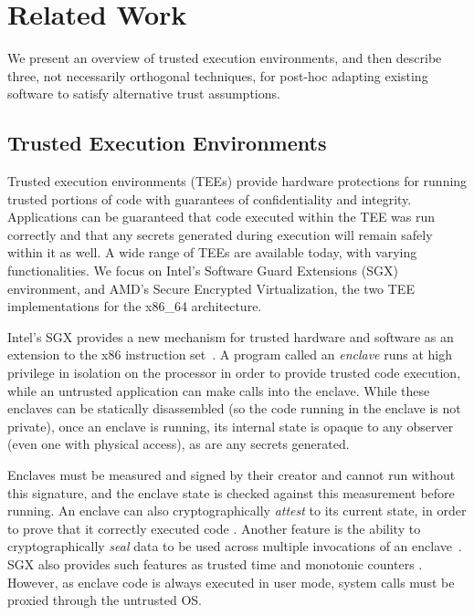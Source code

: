\section{Related Work}
\label{sec:related}

We present an overview of trusted execution environments, and then describe
three, not necessarily orthogonal techniques, for post-hoc adapting existing
software to satisfy alternative trust assumptions. 


\subsection{Trusted Execution Environments}

Trusted execution environments (TEEs) provide hardware protections for running
trusted portions of code with guarantees of confidentiality and integrity.  
%
Applications can be guaranteed that code executed within the TEE was run
correctly and that any secrets generated during execution will remain safely
within it as well.
%
A wide range of TEEs are available today, with varying functionalities.
%
We focus on Intel's Software Guard Extensions (SGX) environment, and AMD's
Secure Encrypted Virtualization, the two TEE implementations for the x86\_64
architecture.


%
Intel's SGX provides a new mechanism for trusted
hardware and software as an extension to the x86 instruction set~\cite{sgx,
mckeen2013innovative}.  
%
A program called an \textit{enclave} runs at high
privilege in isolation on the processor in order to provide trusted code
execution, while an untrusted application can make calls into the enclave.
%
While these enclaves can be statically disassembled (so the code running in the
enclave is not private), once an enclave is running, its internal state is
opaque to any observer (even one with physical access), as are any secrets generated.  


Enclaves must be measured and signed by their creator and cannot run without
this signature, and the enclave state is checked against this measurement
before running.  
%
An enclave can also cryptographically \textit{attest} to its current state, in
order to prove that it correctly executed code \cite{sgx_provisioning,
anati2013innovative}.  
%
Another feature is the ability to cryptographically \textit{seal} data to be
used across multiple invocations of an enclave~\cite{anati2013innovative,
sgx_sealing}.  
%
SGX also provides such features as trusted time and monotonic counters
\cite{sgx-linux-sdk,sgx-trusted-time}.  
%
However, as enclave code is always executed in user mode, system calls
must be proxied through the untrusted OS.


